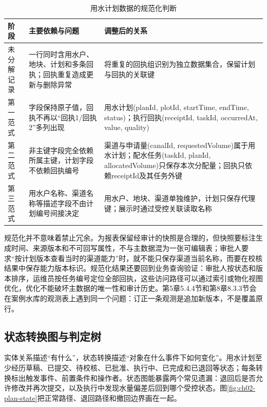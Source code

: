 \begin{table}[htbp]
\centering
\caption{用水计划数据的规范化判断}
\label{tab:ch02-normalization}
\begin{tabular}{p{2.1cm}p{4.0cm}p{5.8cm}}
\toprule
阶段 & 主要依赖与问题 & 调整后的关系 \\
\midrule
未分解记录 & 一行同时含用水户、地块、计划和多条回执；回执重复造成更新与删除异常 & 将重复的回执组识别为独立数据集合，保留计划与回执的关联键 \\
第一范式 & 字段保持原子值，回执不再以“回执1/回执2”多列出现 & 用水计划(planId, plotId, startTime, endTime, status)；执行回执(receiptId, taskId, occurredAt, value, quality) \\
第二范式 & 非主键字段完全依赖所属主键，计划字段不依赖回执编号 & 渠道与申请量(canalId, requestedVolume)属于用水计划；配水任务(taskId, planId, allocatedVolume)只保存本次分配量；回执只依赖receiptId及其任务外键 \\
第三范式 & 用水户名称、渠道名称等描述字段不由计划编号间接决定 & 用水户、地块、渠道单独维护，计划只保存代理键；展示时通过受控关联读取名称 \\
\bottomrule
\end{tabular}
\end{table}

规范化并不意味着禁止冗余。为报表保留经审计的快照是合理的，但快照要标注生成时间、来源版本和不可回写属性，不与主数据混为一张可编辑表；审批人要求“按计划版本查看当时的渠道能力”时，就不能只保存渠道当前名称，而要在校核结果中保存能力版本标识。规范化结果还要回到业务查询验证：审批人按状态和版本排序，运维员按任务编号定位全部回执，这些访问路径可以通过索引或物化视图优化，优化不能破坏主数据的唯一性和审计历史。第5章5.4.4节和第8章8.3.3节会在案例水库的观测表上遇到同一个问题：订正一条观测是追加新版本，不是覆盖原行。

\subsection{状态转换图与判定树}

实体关系描述“有什么”，状态转换描述“对象在什么事件下如何变化”。用水计划至少经历草稿、已提交、待校核、已批准、执行中、已完成和已退回等状态；每条转换标出触发事件、前置条件和操作者。状态图能暴露两个常见遗漏：退回后是否允许修改并再次提交，以及执行中发现水量偏差后回到哪个受控状态。图\ref{fig:ch02-plan-state}把正常路径、退回路径和撤回边界画在一起。

